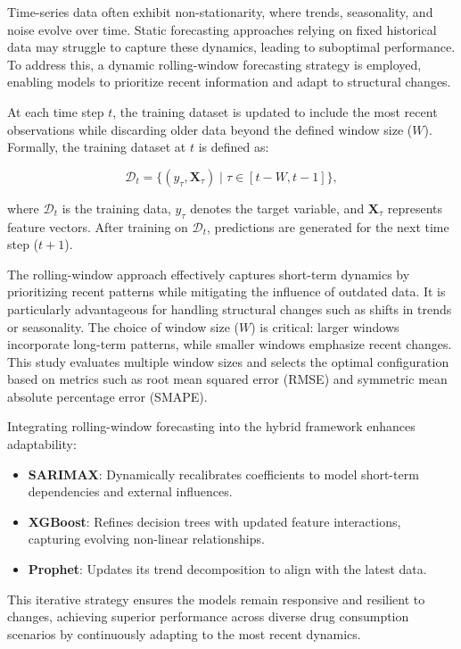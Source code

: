 \documentclass[journal]{IEEEtran}
\begin{document}
Time-series data often exhibit non-stationarity, where trends, seasonality, and noise evolve over time. Static forecasting approaches relying on fixed historical data may struggle to capture these dynamics, leading to suboptimal performance. To address this, a dynamic rolling-window forecasting strategy is employed, enabling models to prioritize recent information and adapt to structural changes.

At each time step \(t\), the training dataset is updated to include the most recent observations while discarding older data beyond the defined window size (\(W\)). Formally, the training dataset at \(t\) is defined as:

\[
\mathcal{D}_{t} = \{(y_{\tau}, \mathbf{X}_{\tau}) \mid \tau \in [t - W, t-1]\},
\]

where \(\mathcal{D}_{t}\) is the training data, \(y_{\tau}\) denotes the target variable, and \(\mathbf{X}_{\tau}\) represents feature vectors. After training on \(\mathcal{D}_{t}\), predictions are generated for the next time step (\(t+1\)).

The rolling-window approach effectively captures short-term dynamics by prioritizing recent patterns while mitigating the influence of outdated data. It is particularly advantageous for handling structural changes such as shifts in trends or seasonality. The choice of window size (\(W\)) is critical: larger windows incorporate long-term patterns, while smaller windows emphasize recent changes. This study evaluates multiple window sizes and selects the optimal configuration based on metrics such as root mean squared error (RMSE) and symmetric mean absolute percentage error (SMAPE).

Integrating rolling-window forecasting into the hybrid framework enhances adaptability:
\begin{itemize}
    \item \textbf{SARIMAX}: Dynamically recalibrates coefficients to model short-term dependencies and external influences.
    \item \textbf{XGBoost}: Refines decision trees with updated feature interactions, capturing evolving non-linear relationships.
    \item \textbf{Prophet}: Updates its trend decomposition to align with the latest data.
\end{itemize}

This iterative strategy ensures the models remain responsive and resilient to changes, achieving superior performance across diverse drug consumption scenarios by continuously adapting to the most recent dynamics.
\end{document}
